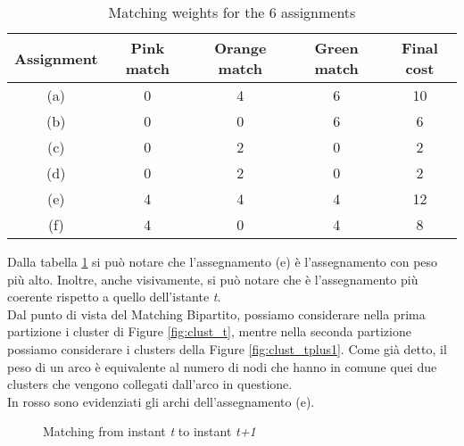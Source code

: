 \begin{table}[H]
  \centering
  \begin{tabular}{|c|c|c|c|c|}
    \hline
    Assignment & Pink match & Orange match & Green match & Final cost \\
    \hline
    (a) & 0 & 4 & 6 & 10 \\
    \hline
    (b) & 0 & 0 & 6 & 6 \\
    \hline
    (c) & 0 & 2 & 0 & 2 \\
    \hline
    (d) & 0 & 2 & 0 & 2 \\
    \hline
    (e) & 4 & 4 & 4 & 12 \\
    \hline
    (f) & 4 & 0 & 4 & 8 \\
    \hline
  \end{tabular}
  \caption{Matching weights for the 6 assignments}
  \label{tab:table_clust}
\end{table}
 
Dalla tabella \ref{tab:table_clust} si può notare che l'assegnamento (e) è l'assegnamento con peso più alto.
Inoltre, anche visivamente, si può notare che è l'assegnamento più coerente rispetto a quello dell'istante \textit{t}.
\\

Dal punto di vista del Matching Bipartito, possiamo considerare nella prima partizione i cluster di Figure \ref{fig:clust_t}, mentre nella seconda partizione possiamo considerare i clusters della Figure \ref{fig:clust_tplus1}.
Come già detto, il peso di un arco è equivalente al numero di nodi che hanno in comune quei due clusters che vengono collegati dall'arco in questione. \\
In rosso sono evidenziati gli archi dell'assegnamento (e).


\begin{figure}[H]
  \centering
  \caption{Matching from instant \textit{t} to instant \textit{t+1}}
  \label{fig:clust_match}
\end{figure}



